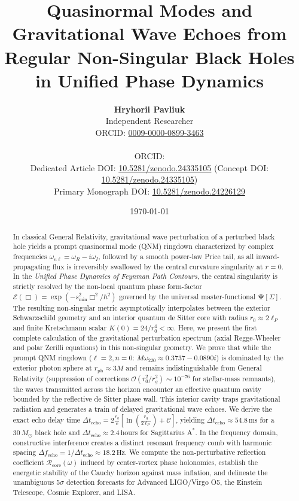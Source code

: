\documentclass[11pt,a4paper]{article}
\title{\textbf{Quasinormal Modes and Gravitational Wave Echoes from Regular Non-Singular Black Holes in Unified Phase Dynamics}}
\author{\textbf{Hryhorii Pavliuk}\\[0.3em]
\small Independent Researcher\\[0.2em]
\small ORCID: \href{https://orcid.org/0009-0000-0899-3463}{0009-0000-0899-3463}\\[0.2em]\\
\small ORCID: \texttt{}\\[0.2em]
\small Dedicated Article DOI: \href{https://doi.org/10.5281/zenodo.24335105}{10.5281/zenodo.24335105} \quad (Concept DOI: \href{https://doi.org/10.5281/zenodo.24335105}{10.5281/zenodo.24335105})\\[0.2em]
\small Primary Monograph DOI: \href{https://doi.org/10.5281/zenodo.24226129}{10.5281/zenodo.24226129}}
\date{\today}
\begin{document}
\maketitle

\begin{abstract}
In classical General Relativity, gravitational wave perturbation of a perturbed black hole yields a prompt quasinormal mode (QNM) ringdown characterized by complex frequencies $\omega_{n\ell} = \omega_R - i \omega_I$, followed by a smooth power-law Price tail, as all inward-propagating flux is irreversibly swallowed by the central curvature singularity at $r=0$. In the \textit{Unified Phase Dynamics of Feynman Path Contours}, the central singularity is strictly resolved by the non-local quantum phase form-factor $\mathcal{E}(\Box) = \exp(-s_{\min}^2 \Box^2/\hbar^2)$ governed by the universal master-functional $\mathbf{\Psi}[\Sigma]$. The resulting non-singular metric asymptotically interpolates between the exterior Schwarzschild geometry and an interior quantum de Sitter core with radius $r_0 \approx 2\ell_P$ and finite Kretschmann scalar $K(0) = 24/r_0^4 < \infty$. Here, we present the first complete calculation of the gravitational perturbation spectrum (axial Regge-Wheeler and polar Zerilli equations) in this non-singular geometry. We prove that while the prompt QNM ringdown ($\ell=2, n=0$: $M\omega_{220} \approx 0.3737 - 0.0890 i$) is dominated by the exterior photon sphere at $r_{\mathrm{ph}} \approx 3M$ and remains indistinguishable from General Relativity (suppression of corrections $\mathcal{O}(r_0^2/r_g^2) \sim 10^{-76}$ for stellar-mass remnants), the waves transmitted across the horizon encounter an effective quantum cavity bounded by the reflective de Sitter phase wall. This interior cavity traps gravitational radiation and generates a train of delayed gravitational wave echoes. We derive the exact echo delay time $\Delta t_{\mathrm{echo}} = 2 \frac{r_g}{c} \left[ \ln\left(\frac{r_g}{2\ell_P}\right) + \mathcal{C} \right]$, yielding $\Delta t_{\mathrm{echo}} \approx 54.8\,\mathrm{ms}$ for a $30\,M_\odot$ black hole and $\Delta t_{\mathrm{echo}} \approx 2.4\,\mathrm{hours}$ for Sagittarius $\mathrm{A}^*$. In the frequency domain, constructive interference creates a distinct resonant frequency comb with harmonic spacing $\Delta f_{\mathrm{echo}} = 1/\Delta t_{\mathrm{echo}} \approx 18.2\,\mathrm{Hz}$. We compute the non-perturbative reflection coefficient $\mathcal{R}_{\mathrm{core}}(\omega)$ induced by center-vortex phase holonomies, establish the energetic stability of the Cauchy horizon against mass inflation, and delineate the unambiguous 5$\sigma$ detection forecasts for Advanced LIGO/Virgo O5, the Einstein Telescope, Cosmic Explorer, and LISA.
\end{abstract}
\end{document}
